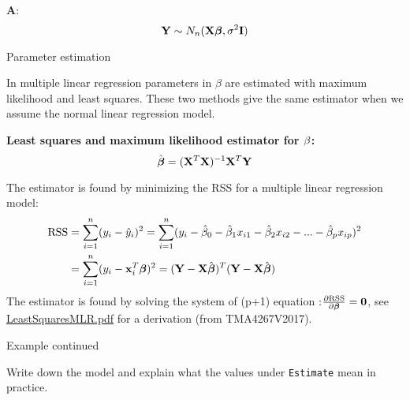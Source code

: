 \documentclass[ignorenonframetext,]{beamer}
\begin{document}
\begin{frame}

\textbf{A}:
\[ {\bf Y} \sim N_{n}({\bf X} {\boldsymbol\beta},\sigma^2 {\bf I})\]

\end{frame}

\begin{frame}

\begin{block}{Parameter estimation}

In multiple linear regression parameters in \(\beta\) are estimated with
maximum likelihood and least squares. These two methods give the same
estimator when we assume the normal linear regression model.

\textbf{Least squares and maximum likelihood estimator for
\({\bf \beta}\):}
\[ \hat{\boldsymbol\beta}=({\bf X}^T{\bf X})^{-1} {\bf X}^T {\bf Y}\]

\end{block}

\end{frame}

\begin{frame}

The estimator is found by minimizing the RSS for a multiple linear
regression model:
\[\begin{aligned} \text{RSS} &=\sum_{i=1}^n (y_i - \hat y_i)^2 = \sum_{i=1}^n (y_i - \hat \beta_0 - \hat \beta_1 x_{i1} - \hat \beta_2 x_{i2} -...-\hat \beta_p x_{ip} )^2 \\
&= \sum_{i=1}^n (y_i-{\bf x}_i^T \boldsymbol \beta)^2=({\bf Y}-{\bf X}\hat{\boldsymbol{\beta}})^T({\bf Y}-{\bf X}\hat{\boldsymbol{\beta}})\end{aligned}\]
The estimator is found by solving the system of (p+1) equation
:\(\frac{\partial \text{RSS}}{\partial \boldsymbol \beta}={\bf 0}\), see
\href{https://www.math.ntnu.no/emner/TMA4268/2018v/notes/LeastSquaresMLR.pdf}{LeastSquaresMLR.pdf}
for a derivation (from TMA4267V2017).

\end{frame}

\begin{frame}[fragile]

\begin{block}{Example continued}

Write down the model and explain what the values under \texttt{Estimate}
mean in practice.

\end{block}

\end{frame}
\end{document}

